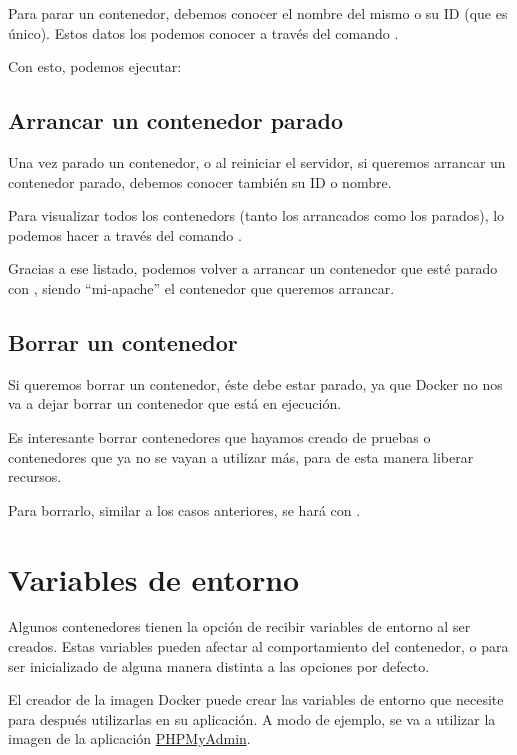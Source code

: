 Para parar un contenedor, debemos conocer el nombre del mismo o su ID (que es único). Estos datos los podemos conocer a través del comando  .

Con esto, podemos ejecutar:


\subsection{Arrancar un contenedor parado}

Una vez parado un contenedor, o al reiniciar el servidor, si queremos arrancar un contenedor parado, debemos conocer también su ID o nombre.

Para visualizar todos los contenedors (tanto los arrancados como los parados), lo podemos hacer a través del comando .

Gracias a ese listado, podemos volver a arrancar un contenedor que esté parado con , siendo “mi-apache” el contenedor que queremos arrancar.

\subsection{Borrar un contenedor}
Si queremos borrar un contenedor, éste debe estar parado, ya que Docker no nos va a dejar borrar un contenedor que está en ejecución.

Es interesante borrar contenedores que hayamos creado de pruebas o contenedores que ya no se vayan a utilizar más, para de esta manera liberar recursos.

Para borrarlo, similar a los casos anteriores, se hará con .

\section{Variables de entorno}
Algunos contenedores tienen la opción de recibir variables de entorno al ser creados. Estas variables pueden afectar al comportamiento del contenedor, o para ser inicializado de alguna manera distinta a las opciones por defecto.

El creador de la imagen Docker puede crear las variables de entorno que necesite para después utilizarlas en su aplicación. A modo de ejemplo, se va a utilizar la imagen de la aplicación \href{https://hub.docker.com/_/phpmyadmin}{PHPMyAdmin}.

